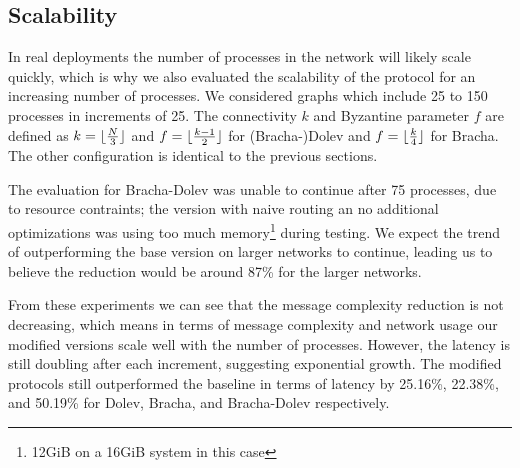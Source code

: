 \subsection{Scalability}
In real deployments the number of processes in the network will likely scale quickly, which is why we also evaluated the scalability of the protocol for an increasing number of processes. We considered graphs which include 25 to 150 processes in increments of 25. The connectivity $k$ and Byzantine parameter $f$ are defined as $k=\lfloor\frac{N}{3}\rfloor$ and $f=\lfloor\frac{k-1}{2}\rfloor$ for (Bracha-)Dolev and $f=\lfloor\frac{k}{4}\rfloor$ for Bracha. The other configuration is identical to the previous sections.

The evaluation for Bracha-Dolev was unable to continue after 75 processes, due to resource contraints; the version with naive routing an no additional optimizations was using too much memory\footnote{12GiB on a 16GiB system in this case} during testing. 
We expect the trend of outperforming the base version on larger networks to continue, leading us to believe the reduction would be around 87\% for the larger networks.

From these experiments we can see that the message complexity reduction is not decreasing, which means in terms of message complexity and network usage our modified versions scale well with the number of processes. However, the latency is still doubling after each increment, suggesting exponential growth. The modified protocols still outperformed the baseline in terms of latency by 25.16\%, 22.38\%, and 50.19\% for Dolev, Bracha, and Bracha-Dolev respectively.

